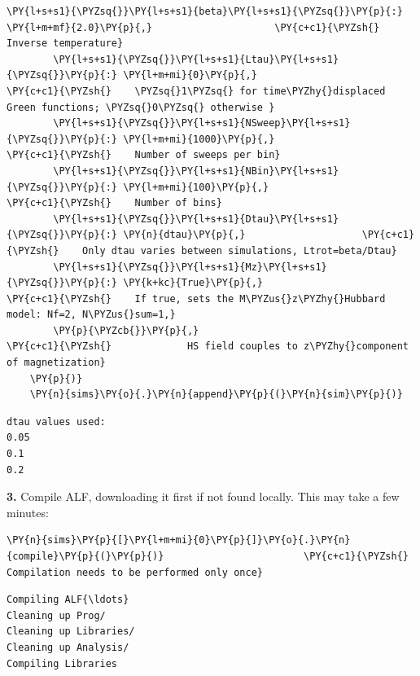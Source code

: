 \begin{tcolorbox}[breakable, size=fbox, boxrule=1pt, pad at break*=1mm,colback=cellbackground, colframe=cellborder]
\begin{Verbatim}[commandchars=\\\{\}]
        \PY{l+s+s1}{\PYZsq{}}\PY{l+s+s1}{beta}\PY{l+s+s1}{\PYZsq{}}\PY{p}{:} \PY{l+m+mf}{2.0}\PY{p}{,}                     \PY{c+c1}{\PYZsh{}    Inverse temperature}
        \PY{l+s+s1}{\PYZsq{}}\PY{l+s+s1}{Ltau}\PY{l+s+s1}{\PYZsq{}}\PY{p}{:} \PY{l+m+mi}{0}\PY{p}{,}                       \PY{c+c1}{\PYZsh{}    \PYZsq{}1\PYZsq{} for time\PYZhy{}displaced Green functions; \PYZsq{}0\PYZsq{} otherwise }
        \PY{l+s+s1}{\PYZsq{}}\PY{l+s+s1}{NSweep}\PY{l+s+s1}{\PYZsq{}}\PY{p}{:} \PY{l+m+mi}{1000}\PY{p}{,}                  \PY{c+c1}{\PYZsh{}    Number of sweeps per bin}
        \PY{l+s+s1}{\PYZsq{}}\PY{l+s+s1}{NBin}\PY{l+s+s1}{\PYZsq{}}\PY{p}{:} \PY{l+m+mi}{100}\PY{p}{,}                     \PY{c+c1}{\PYZsh{}    Number of bins}
        \PY{l+s+s1}{\PYZsq{}}\PY{l+s+s1}{Dtau}\PY{l+s+s1}{\PYZsq{}}\PY{p}{:} \PY{n}{dtau}\PY{p}{,}                    \PY{c+c1}{\PYZsh{}    Only dtau varies between simulations, Ltrot=beta/Dtau}
        \PY{l+s+s1}{\PYZsq{}}\PY{l+s+s1}{Mz}\PY{l+s+s1}{\PYZsq{}}\PY{p}{:} \PY{k+kc}{True}\PY{p}{,}                      \PY{c+c1}{\PYZsh{}    If true, sets the M\PYZus{}z\PYZhy{}Hubbard model: Nf=2, N\PYZus{}sum=1,}
        \PY{p}{\PYZcb{}}\PY{p}{,}                               \PY{c+c1}{\PYZsh{}             HS field couples to z\PYZhy{}component of magnetization}
    \PY{p}{)}
    \PY{n}{sims}\PY{o}{.}\PY{n}{append}\PY{p}{(}\PY{n}{sim}\PY{p}{)}
\end{Verbatim}
\end{tcolorbox}

    \begin{Verbatim}[commandchars=\\\{\}]
dtau values used:
0.05
0.1
0.2
    \end{Verbatim}

    \textbf{3.} Compile ALF, downloading it first if not found locally. This
may take a few minutes:

    \begin{tcolorbox}[breakable, size=fbox, boxrule=1pt, pad at break*=1mm,colback=cellbackground, colframe=cellborder]
\begin{Verbatim}[commandchars=\\\{\}]
\PY{n}{sims}\PY{p}{[}\PY{l+m+mi}{0}\PY{p}{]}\PY{o}{.}\PY{n}{compile}\PY{p}{(}\PY{p}{)}                        \PY{c+c1}{\PYZsh{} Compilation needs to be performed only once}
\end{Verbatim}
\end{tcolorbox}

    \begin{Verbatim}[commandchars=\\\{\}]
Compiling ALF{\ldots}
Cleaning up Prog/
Cleaning up Libraries/
Cleaning up Analysis/
Compiling Libraries
    \end{Verbatim}


